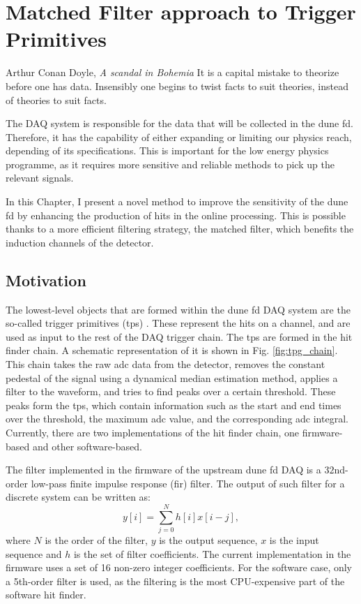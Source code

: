\chapter{Matched Filter approach to Trigger Primitives}\label{chapter:matched_filter}

\begin{chapquote}{Arthur Conan Doyle, \textit{A scandal in Bohemia}}
	It is a capital mistake to theorize before one has data. Insensibly one begins to twist facts to suit theories, instead of theories to suit facts.
\end{chapquote}

The DAQ system is responsible for the data that will be collected in the \gls{dune} \gls{fd}. Therefore, it has the capability of either expanding or limiting our physics reach, depending of its specifications. This is important for the low energy physics programme, as it requires more sensitive and reliable methods to pick up the relevant signals.

In this Chapter, I present a novel method to improve the sensitivity of the \gls{dune} \gls{fd} by enhancing the production of hits in the online processing. This is possible thanks to a more efficient filtering strategy, the matched filter, which benefits the induction channels of the detector.

\section{Motivation}
\label{sec:matched_filter_motivation}

The lowest-level objects that are formed within the \gls{dune} \gls{fd} DAQ system are the so-called trigger primitives (\gls{tp}s) \cite{DUNEDAQ2022}. These represent the hits on a channel, and are used as input to the rest of the DAQ trigger chain. The \gls{tp}s are formed in the hit finder chain. A schematic representation of it is shown in Fig. \ref{fig:tpg_chain}. This chain takes the raw \gls{adc} data from the detector, removes the constant pedestal of the signal using a dynamical median estimation method, applies a filter to the waveform, and tries to find peaks over a certain threshold. These peaks form the \gls{tp}s, which contain information such as the start and end times over the threshold, the maximum \gls{adc} value, and the corresponding \gls{adc} integral. Currently, there are two implementations of the hit finder chain, one firmware-based and other software-based.

The filter implemented in the firmware of the upstream \gls{dune} \gls{fd} DAQ is a $32$nd-order low-pass finite impulse response (\gls{fir}) filter. The output of such filter for a discrete system can be written as:
\begin{equation}\label{2.1.1}
	y[i] = \sum_{j=0}^{N} h[i] x[i-j],
\end{equation}
where $N$ is the order of the filter, $y$ is the output sequence, $x$ is the input sequence and $h$ is the set of filter coefficients. The current implementation in the firmware uses a set of 16 non-zero integer coefficients. For the software case, only a 5th-order filter is used, as the filtering is the most CPU-expensive part of the software hit finder.

